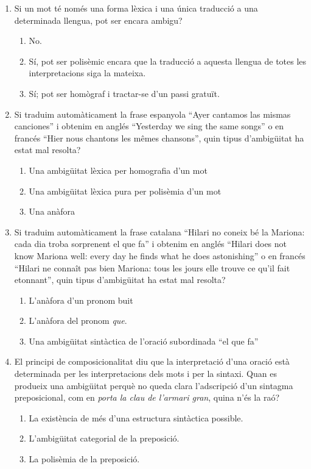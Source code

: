 \begin{enumerate}
\item Si un mot té només una forma lèxica i una única traducció a una
  determinada llengua, pot ser encara ambigu?
  \begin{enumerate}
  \item No.
  \item Sí, pot ser polisèmic encara que la traducció a aquesta
    llengua de totes les interpretacions siga la mateixa.
  \item Sí; pot ser homògraf i tractar-se d'un passi gratuït.
  \end{enumerate}

\item Si traduim automàticament la frase espanyola ``Ayer cantamos las
  mismas canciones'' i obtenim en anglés ``Yesterday we sing the same
  songs'' o en francés ``Hier nous chantons les mêmes chansons'', quin
  tipus d'ambigüitat ha estat mal resolta?
  \begin{enumerate}
  \item Una ambigüitat lèxica per homografia d'un mot
  \item Una ambigüitat lèxica pura per polisèmia d'un mot
  \item Una anàfora
  \end{enumerate}

\item Si traduim automàticament la frase catalana ``Hilari no coneix
  bé la Mariona: cada dia troba sorprenent el que fa'' i obtenim en
  anglés ``Hilari does not know Mariona well: every day he finds what
  he does astonishing'' o en francés ``Hilari ne connaît pas bien
  Mariona: tous les jours elle trouve ce qu'il fait etonnant'', quin
  tipus d'ambigüitat ha estat mal resolta?
  \begin{enumerate}
  \item L'anàfora d'un pronom buit
  \item L'anàfora del pronom \emph{que}.
  \item Una ambigüitat sintàctica de l'oració subordinada ``el que
    fa''
  \end{enumerate}

\item El principi de composicionalitat diu que la interpretació d'una
  oració està determinada per les interpretacions dels mots i per la
  sintaxi. Quan es produeix una ambigüitat perquè no queda clara
  l'adscripció d'un sintagma preposicional, com en \emph{porta la clau
    de l'armari gran}, quina n'és la raó?  
  \begin{enumerate}
  \item La existència de més d'una estructura sintàctica possible.
  \item L'ambigüitat categorial de la preposició.
  \item La polisèmia de la preposició.
  \end{enumerate}


\end{enumerate}
